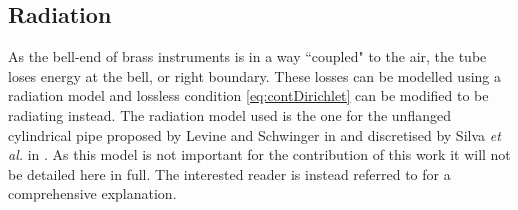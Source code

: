 

\subsection{Radiation}
As the bell-end of brass instruments is in a way ``coupled" to the air, the tube loses energy at the bell, or right boundary. These losses can be modelled using a radiation model and lossless condition \eqref{eq:contDirichlet} can be modified to be radiating instead. The radiation model used is the one for the unflanged cylindrical pipe proposed by Levine and Schwinger in \cite{Levine1948} and discretised by Silva \emph{et al.} in \cite{Silva2009}. As this model is not important for the contribution of this work it will not be detailed here in full. The interested reader is instead referred to \cite{Harrison2018} for a comprehensive explanation. 